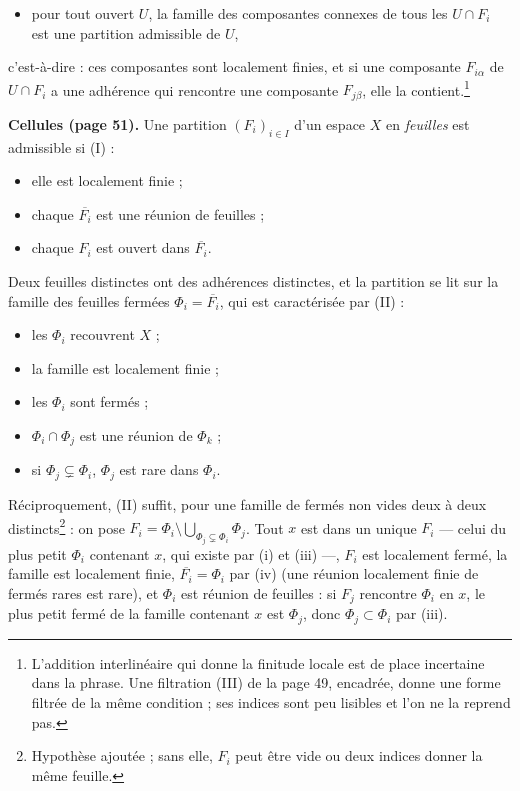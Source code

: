 \documentclass[11pt,a4paper]{article}
\begin{document}
\begin{itemize}
\item[(C)] pour tout ouvert $U$, la famille des composantes connexes de tous
  les $U \cap F_i$ est une partition admissible de $U$,
\end{itemize}

c'est-à-dire : ces composantes sont localement finies, et si une composante
$F_{i\alpha}$ de $U \cap F_i$ a une adhérence qui rencontre une composante
$F_{j\beta}$, elle la contient.\footnote{L'addition interlinéaire qui donne la
finitude locale est de place incertaine dans la phrase. Une filtration (III)
de la page 49, encadrée, donne une forme filtrée de la même condition ; ses
indices sont peu lisibles et l'on ne la reprend pas.}

\textbf{Cellules (page 51).} Une partition $(F_i)_{i \in I}$ d'un espace $X$
en \emph{feuilles} est admissible si (I) :

\begin{itemize}
\item[(i)] elle est localement finie ;
\item[(ii)] chaque $\overline{F_i}$ est une réunion de feuilles ;
\item[(iii)] chaque $F_i$ est ouvert dans $\overline{F_i}$.
\end{itemize}

Deux feuilles distinctes ont des adhérences distinctes, et la partition se
lit sur la famille des feuilles fermées $\Phi_i = \overline{F_i}$, qui est
caractérisée par (II) :

\begin{itemize}
\item[(0)] les $\Phi_i$ recouvrent $X$ ;
\item[(i)] la famille est localement finie ;
\item[(ii)] les $\Phi_i$ sont fermés ;
\item[(iii)] $\Phi_i \cap \Phi_j$ est une réunion de $\Phi_k$ ;
\item[(iv)] si $\Phi_j \subsetneq \Phi_i$, $\Phi_j$ est rare dans $\Phi_i$.
\end{itemize}

Réciproquement, (II) suffit, pour une famille de fermés non vides deux à deux
distincts\footnote{Hypothèse ajoutée ; sans elle, $F_i$ peut être vide ou deux
indices donner la même feuille.} : on pose $F_i = \Phi_i \setminus
\bigcup_{\Phi_j \subsetneq \Phi_i} \Phi_j$. Tout $x$ est dans un unique $F_i$
— celui du plus petit $\Phi_i$ contenant $x$, qui existe par (i) et (iii) —,
$F_i$ est localement fermé, la famille est localement finie, $\overline{F_i}
= \Phi_i$ par (iv) (une réunion localement finie de fermés rares est rare), et
$\Phi_i$ est réunion de feuilles : si $F_j$ rencontre $\Phi_i$ en $x$, le plus
petit fermé de la famille contenant $x$ est $\Phi_j$, donc $\Phi_j \subset
\Phi_i$ par (iii).
\end{document}
